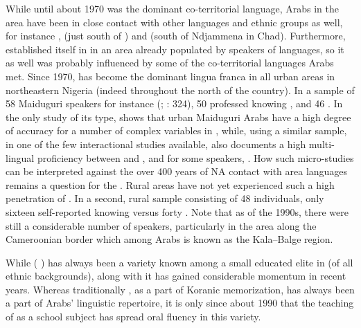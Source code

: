 \documentclass[output=paper]{langsci/langscibook}
\begin{document}
While until about 1970  was the dominant co-territorial language, Arabs in the  area have been in close contact with other languages and ethnic groups as well, for instance ,  (just south of ) and  (south of Ndjammena in Chad). Furthermore,  established itself in  in an area already populated by speakers of  languages, so it as well was probably influenced by some of the co-territorial languages Arabs met. Since 1970,  has become the dominant lingua franca in all urban areas in northeastern Nigeria (indeed throughout the north of the country). In a sample of 58 Maiduguri speakers for instance (\citealt{Owens1998}; \citealt{Owens2000article}: 324), 50 professed knowing , and 46 . In the only study of its type, \citet{Broß2007} shows that urban Maiduguri  Arabs have a high degree of accuracy for a number of complex variables in , while, using a similar sample, in one of the few interactional studies available, \citet{Owens2002} also documents a high multi-lingual proficiency between  and , and for some speakers, . How such micro-studies can be interpreted against the over 400 years of NA contact with area languages remains a question for the . Rural areas have not yet experienced such a high penetration of . In a second, rural sample consisting of 48 individuals, only sixteen self-reported knowing  versus forty . Note that as of the 1990s, there were still a considerable number of   speakers, particularly in the area along the Cameroonian border which among  Arabs is known as the Kala--Balge region.

While   ( ) has always been a variety known among a small educated elite in  (of all ethnic backgrounds), along with  it has gained considerable momentum in recent years. Whereas traditionally  , as a part of Koranic memorization, has always been a part of Arabs’ linguistic repertoire, it is only since about 1990 that the teaching of   as a school subject has spread oral fluency in this variety.
\end{document}
